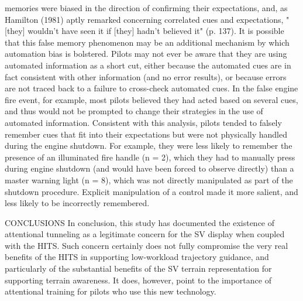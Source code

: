 \documentclass[utf8,bachelor,manualbib]{gradu3}
\begin{document}
memories were biased in the direction of confirming their expectations, and, as
Hamilton (1981) aptly remarked concerning correlated cues and expectations,
"[they] wouldn't have seen it if [they] hadn't believed it" (p. 137).
It is possible that this false memory phenomenon may be an additional mechanism
by which automation bias is bolstered. Pilots may not ever be aware that they
are using automated information as a short cut, either because the automated cues
are in fact consistent with other information (and no error results), or because errors
are not traced back to a failure to cross-check automated cues. In the false engine
fire event, for example, most pilots believed they had acted based on several cues,
and thus would not be prompted to change their strategies in the use of automated
information. Consistent with this analysis, pilots tended to falsely remember cues
that fit into their expectations but were not physically handled during the engine
shutdown. For example, they were less likely to remember the presence of an
illuminated fire handle (n = 2), which they had to manually press during engine
shutdown (and would have been forced to observe directly) than a master warning
light (n = 8), which was not directly manipulated as part of the shutdown procedure.
Explicit manipulation of a control made it more salient, and less likely to be
incorrectly remembered. \citep{mosier1998}

CONCLUSIONS
In conclusion, this study has documented the existence of attentional tunneling as a
legitimate concern for the SV display when coupled with the HITS. Such concern certainly does not fully compromise the very real benefits of the HITS in supporting
low-workload trajectory guidance, and particularly of the substantial benefits of the
SV terrain representation for supporting terrain awareness. It does, however, point to
the importance of attentional training for pilots who use this new technology. \citep{wickens2009}

\end{document}
